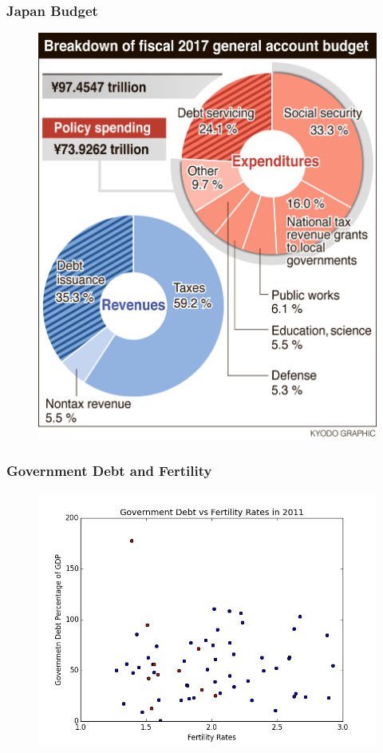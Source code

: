 \documentclass[11pt]{beamer}
\theoremstyle{definition}
\begin{document}
\begin{frame}
    \frametitle{Japan Budget}
\begin{figure}
	\centering
\includegraphics[scale=0.5]{japan_budget.jpg}
	\label{V2}
\end{figure}

\end{frame}


\begin{frame}
    \frametitle{Government Debt and Fertility}
\begin{figure}
	\centering
\includegraphics[scale=0.5]{Debt_Fert.png}
	\label{V3}
\end{figure}

\end{frame}
\end{document}
